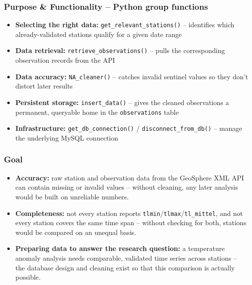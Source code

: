 \documentclass[11pt,t,usepdftitle=false,aspectratio=169]{beamer}
\begin{document}
\begin{frame}
\frametitle{Purpose \& Functionality -- Python group functions}

  \begin{itemize}
    \item \textbf{Selecting the right data:} \texttt{get\_relevant\_stations()}
      -- identifies which already-validated stations qualify for a
      given date range

    \bigskip

    \item \textbf{Data retrieval:} \texttt{retrieve\_observations()} --
      pulls the corresponding observation records from the API

    \bigskip

    \item \textbf{Data accuracy:} \texttt{NA\_cleaner()} -- catches
      invalid sentinel values so they don't distort later results

    \bigskip

    \item \textbf{Persistent storage:} \texttt{insert\_data()} -- gives
      the cleaned observations a permanent, queryable home in the
      \texttt{observations} table

    \bigskip

    \item \textbf{Infrastructure:} \texttt{get\_db\_connection()} /
      \texttt{disconnect\_from\_db()} -- manage the underlying MySQL
      connection
  \end{itemize}

\end{frame}







\begin{frame}
\frametitle{Goal}

  \begin{itemize}
    \item \textbf{Accuracy:} raw station and observation data from the
      GeoSphere XML API can contain missing or invalid values --
      without cleaning, any later analysis would be built on
      unreliable numbers.

    \bigskip

    \item \textbf{Completeness:} not every station reports
      \texttt{tlmin}/\texttt{tlmax}/\texttt{tl\_mittel}, and not every
      station covers the same time span -- without checking for both,
      stations would be compared on an unequal basis.

    \bigskip

    \item \textbf{Preparing data to answer the research question:} a
      temperature anomaly analysis needs comparable, validated time
      series across stations -- the database design and cleaning exist
      so that this comparison is actually possible.
  \end{itemize}

\end{frame}
\end{document}
